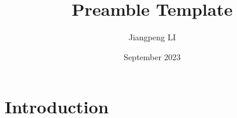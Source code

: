 \documentclass[12pt]{article}
\title{Preamble Template}
\author{Jiangpeng LI}
\date{September 2023}
\begin{document}
\maketitle

\section{Introduction}

\lipsum[2] \cite{sutton2018reinforcement}

\lipsum

\newpage

\printbibliography
\end{document}
